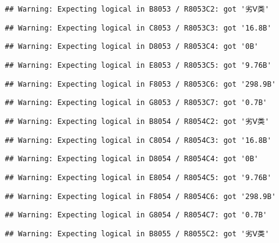 \documentclass[
]{article}
\begin{document}
\begin{verbatim}
## Warning: Expecting logical in B8053 / R8053C2: got '劣Ⅴ类'
\end{verbatim}

\begin{verbatim}
## Warning: Expecting logical in C8053 / R8053C3: got '16.8B'
\end{verbatim}

\begin{verbatim}
## Warning: Expecting logical in D8053 / R8053C4: got '0B'
\end{verbatim}

\begin{verbatim}
## Warning: Expecting logical in E8053 / R8053C5: got '9.76B'
\end{verbatim}

\begin{verbatim}
## Warning: Expecting logical in F8053 / R8053C6: got '298.9B'
\end{verbatim}

\begin{verbatim}
## Warning: Expecting logical in G8053 / R8053C7: got '0.7B'
\end{verbatim}

\begin{verbatim}
## Warning: Expecting logical in B8054 / R8054C2: got '劣Ⅴ类'
\end{verbatim}

\begin{verbatim}
## Warning: Expecting logical in C8054 / R8054C3: got '16.8B'
\end{verbatim}

\begin{verbatim}
## Warning: Expecting logical in D8054 / R8054C4: got '0B'
\end{verbatim}

\begin{verbatim}
## Warning: Expecting logical in E8054 / R8054C5: got '9.76B'
\end{verbatim}

\begin{verbatim}
## Warning: Expecting logical in F8054 / R8054C6: got '298.9B'
\end{verbatim}

\begin{verbatim}
## Warning: Expecting logical in G8054 / R8054C7: got '0.7B'
\end{verbatim}

\begin{verbatim}
## Warning: Expecting logical in B8055 / R8055C2: got '劣Ⅴ类'
\end{verbatim}
\end{document}

